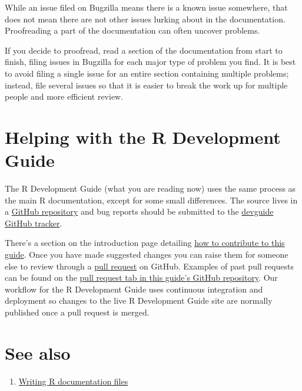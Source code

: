 \documentclass[
  letterpaper,
  DIV=11,
  numbers=noendperiod]{scrreprt}
\providecommand{\tightlist}{%
  \setlength{\itemsep}{0pt}\setlength{\parskip}{0pt}}\usepackage{longtable,booktabs,array}
\begin{document}
While an issue filed on Bugzilla means there is a known issue somewhere,
that does not mean there are not other issues lurking about in the
documentation. Proofreading a part of the documentation can often
uncover problems.

If you decide to proofread, read a section of the documentation from
start to finish, filing issues in Bugzilla for each major type of
problem you find. It is best to avoid filing a single issue for an
entire section containing multiple problems; instead, file several
issues so that it is easier to break the work up for multiple people and
more efficient review.

\section{Helping with the R Development
Guide}\label{helping-with-the-r-development-guide}

The R Development Guide (what you are reading now) uses the same process
as the main R documentation, except for some small differences. The
source lives in a \href{https://github.com/r-devel/rdevguide/}{GitHub
repository} and bug reports should be submitted to the
\href{https://github.com/r-devel/rdevguide/issues}{devguide GitHub
tracker}.

There's a section on the introduction page detailing
\hyperref[how-to-contribute-to-this-guide]{how to contribute to this
guide}. Once you have made suggested changes you can raise them for
someone else to review through a
\href{https://docs.github.com/en/pull-requests/collaborating-with-pull-requests/proposing-changes-to-your-work-with-pull-requests/about-pull-requests}{pull
request} on GitHub. Examples of past pull requests can be found on the
\href{https://github.com/r-devel/rdevguide/pulls?q=is\%3Apr+is\%3Aclosed}{pull
request tab in this guide's GitHub repository}. Our workflow for the R
Development Guide uses continuous integration and deployment so changes
to the live R Development Guide site are normally published once a pull
request is merged.

\section{See also}\label{see-also-5}

\begin{enumerate}
\def\labelenumi{\arabic{enumi}.}
\tightlist
\item
  \href{https://cran.r-project.org/doc/manuals/r-release/R-exts.html\#Writing-R-documentation-files}{Writing
  R documentation files}
\end{enumerate}
\end{document}

